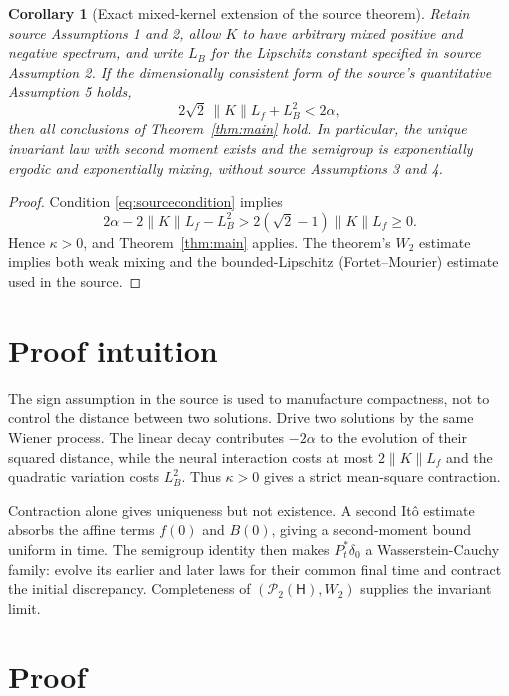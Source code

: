 \documentclass[11pt]{article}
\newtheorem{corollary}[theorem]{Corollary}
\newcommand{\HH}{\mathsf H}
\newcommand{\PP}{\mathcal P_2}
\newcommand{\Wtwo}{W_2}
\begin{document}
\begin{corollary}[Exact mixed-kernel extension of the source theorem]
\label{cor:source}
Retain source Assumptions 1 and 2, allow \(K\) to have arbitrary mixed
positive and negative spectrum, and write \(L_B\) for the Lipschitz constant
specified in source Assumption 2.  If the dimensionally consistent form of
the source's quantitative Assumption 5 holds,
\begin{equation}\label{eq:sourcecondition}
 2\sqrt2\,\lVert K\rVert L_f+L_B^2<2\alpha,
\end{equation}
then all conclusions of Theorem~\ref{thm:main} hold.  In particular, the
unique invariant law with second moment exists and the semigroup is
exponentially ergodic and exponentially mixing, without source Assumptions 3
and 4.
\end{corollary}

\begin{proof}
Condition \eqref{eq:sourcecondition} implies
\[
 2\alpha-2\lVert K\rVert L_f-L_B^2
 >2(\sqrt2-1)\lVert K\rVert L_f\ge0.
\]
Hence \(\kappa>0\), and Theorem~\ref{thm:main} applies.  The theorem's
\(W_2\) estimate implies both weak mixing and the bounded-Lipschitz
(Fortet--Mourier) estimate used in the source.
\end{proof}

\section{Proof intuition}

The sign assumption in the source is used to manufacture compactness, not to
control the distance between two solutions.  Drive two solutions by the same
Wiener process.  The linear decay contributes \(-2\alpha\) to the evolution of
their squared distance, while the neural interaction costs at most
\(2\lVert K\rVert L_f\) and the quadratic variation costs \(L_B^2\).
Thus \(\kappa>0\) gives a strict mean-square contraction.

Contraction alone gives uniqueness but not existence.  A second It\^o estimate
absorbs the affine terms \(f(0)\) and \(B(0)\), giving a second-moment bound
uniform in time.  The semigroup identity then makes \(P_t^*\delta_0\) a
Wasserstein-Cauchy family: evolve its earlier and later laws for their common
final time and contract the initial discrepancy.  Completeness of
\((\PP(\HH),\Wtwo)\) supplies the invariant limit.

\section{Proof}
\end{document}
